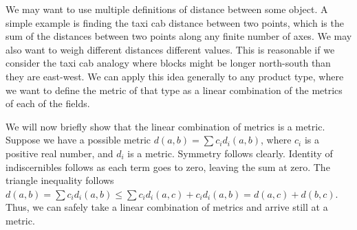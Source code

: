 We may want to use multiple definitions of distance between some object.
A simple example is finding the taxi cab distance between two points,
which is the sum of the distances between two points along any finite number of axes.
We may also want to weigh different distances different values.
This is reasonable if we consider the taxi cab analogy where blocks might be longer north-south 
than they are east-west.
We can apply this idea generally to any product type,
where we want to define the metric of that type as a linear combination of the metrics of each of the fields.

We will now briefly show that the linear combination of metrics is a metric.
Suppose we have a possible metric $d(a, b) = \sum c_id_i(a, b)$, 
where $c_i$ is a positive real number, and $d_i$ is a metric.
Symmetry follows clearly.
Identity of indiscernibles follows as each term goes to zero, leaving the sum at zero.
The triangle inequality follows $d(a, b) = \sum c_id_i(a, b) \le \sum c_id_i(a, c)+c_id_i(a, b) = d(a, c) + d(b, c)$.
Thus, we can safely take a linear combination of metrics and arrive still at a metric.